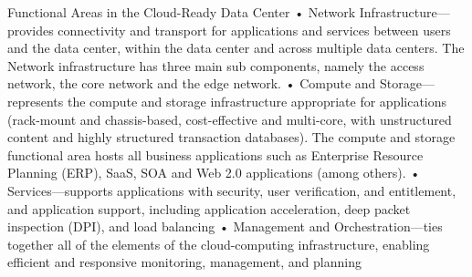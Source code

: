 Functional Areas in the Cloud-Ready Data Center
• Network Infrastructure—provides connectivity and transport for applications and services between users and the data center, within the data center and across multiple data centers. The Network infrastructure has three main sub components, namely the access network, the core network and the edge network.
• Compute and Storage—represents the compute and storage infrastructure appropriate for applications (rack-mount and chassis-based, cost-effective and multi-core, with unstructured content and highly structured transaction databases). The compute and storage functional area hosts all business applications such as Enterprise Resource Planning (ERP), SaaS, SOA and Web 2.0 applications (among others).
• Services—supports applications with security, user verification, and entitlement, and application support, including application acceleration, deep packet inspection (DPI), and load balancing
• Management and Orchestration—ties together all of the elements of the cloud-computing infrastructure, enabling efficient and responsive monitoring, management, and planning
